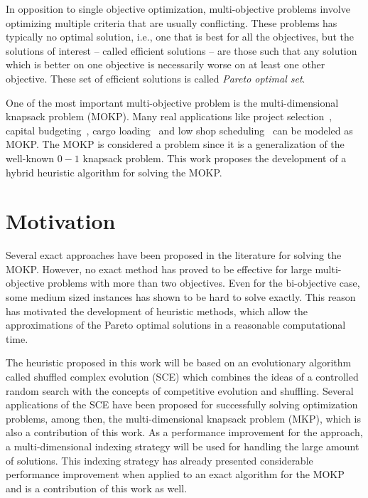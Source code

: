 In opposition to single objective optimization,
multi-objective problems
involve optimizing multiple criteria that are usually conflicting.
These problems has typically no optimal solution, i.e.,
one that is best for all the objectives, but the solutions of interest
-- called efficient solutions -- are those such
that any solution which is better on one
objective is necessarily worse on at least one other objective.
These set of efficient solutions is called \emph{Pareto optimal set}.

One of the most important multi-objective problem is the
multi-dimensional knapsack problem (MOKP).
Many real applications like
project selection~\cite{teng1996multiobjective},
capital budgeting~\cite{rosenblatt1989generating},
cargo loading~\cite{teng1996multiobjective}
and low shop scheduling~\cite{ishibuchi2015behavior}
can be modeled as MOKP.
The MOKP is considered a \nphard{} problem since it is a generalization
of the well-known $0-1$ knapsack problem.
This work proposes the development of a hybrid heuristic algorithm
for solving the MOKP.

\section{Motivation}

Several exact approaches have been proposed in the literature for
solving the MOKP.
However, no exact method has proved to be effective
for large multi-objective problems with more than two objectives.
Even for the bi-objective case, some medium sized instances
has shown to be hard to solve exactly.
This reason has motivated the development of heuristic methods,
which allow the approximations of the
Pareto optimal solutions in a reasonable computational time.


The heuristic proposed in this work will be based on an
evolutionary algorithm called shuffled complex evolution (SCE)
which combines the ideas of a controlled random search with the concepts
of competitive evolution and shuffling.
Several applications of the SCE have been proposed for successfully
solving optimization problems, among then,
the multi-dimensional knapsack problem (MKP), which is
also a contribution of this work.
As a performance improvement for the approach,
a multi-dimensional indexing strategy
will be used for handling the large amount of solutions.
This indexing strategy  has already presented
considerable performance improvement
when applied to an exact algorithm for the MOKP~\cite{baroni2017}
and is a contribution of this work as well.

